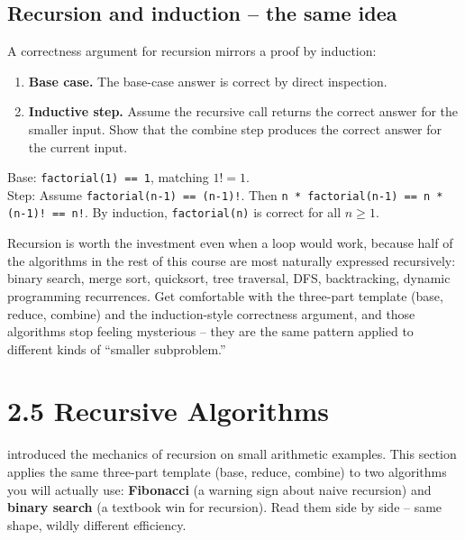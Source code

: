 \documentclass[11pt]{article}
\begin{document}
\subsection{Recursion and induction -- the same idea}

A correctness argument for recursion mirrors a proof by induction:

\begin{enumerate}[leftmargin=*,noitemsep]
    \item \textbf{Base case.} The base-case answer is correct by
          direct inspection.
    \item \textbf{Inductive step.} Assume the recursive call returns
          the correct answer for the smaller input. Show that the
          combine step produces the correct answer for the current
          input.
\end{enumerate}

\begin{examplebox}
Base: \texttt{factorial(1) == 1}, matching $1! = 1$. \\
Step: Assume \texttt{factorial(n-1) == (n-1)!}. Then
\texttt{n * factorial(n-1) == n * (n-1)! == n!}. By induction,
\texttt{factorial(n)} is correct for all $n \ge 1$.
\end{examplebox}

\begin{ideabox}
Recursion is worth the investment even when a loop would work,
because half of the algorithms in the rest of this course are most
naturally expressed recursively: binary search, merge sort, quicksort,
tree traversal, DFS, backtracking, dynamic programming recurrences.
Get comfortable with the three-part template (base, reduce, combine)
and the induction-style correctness argument, and those algorithms
stop feeling mysterious -- they are the same pattern applied to
different kinds of ``smaller subproblem.''
\end{ideabox}

\section{2.5 Recursive Algorithms}

 introduced the mechanics of recursion on small
arithmetic examples. This section applies the same three-part template
(base, reduce, combine) to two algorithms you will actually use:
\textbf{Fibonacci} (a warning sign about naive recursion) and
\textbf{binary search} (a textbook win for recursion). Read them side
by side -- same shape, wildly different efficiency.
\end{document}
